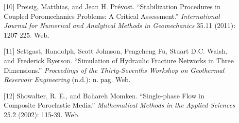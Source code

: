 \documentclass[11pt]{article} %
\begin{document}
\begin{itemize}
	\item[{[10]}] Preisig, Matthias, and Jean H. Prévost. ``Stabilization Procedures in Coupled Poromechanics Problems: A Critical Assessment.'' \textit{International Journal for Numerical and Analytical Methods in Geomechanics} 35.11 (2011): 1207-225. Web.
	\item[{[11]}] Settgast, Randolph, Scott Johnson, Pengcheng Fu, Stuart D.C. Walsh, and Frederick Ryerson. ``Simulation of Hydraulic Fracture Networks in Three Dimensions.'' \textit{Proceedings of the Thirty-Sevenths Workshop on Geothermal Reservoir Engineering} (n.d.): n. pag. Web.
	\item[{[12]}] Showalter, R. E., and Bahareh Momken. ``Single-phase Flow in Composite Poroelastic Media.'' \textit{Mathematical Methods in the Applied Sciences} 25.2 (2002): 115-39. Web.
\end{itemize}
\end{document}

